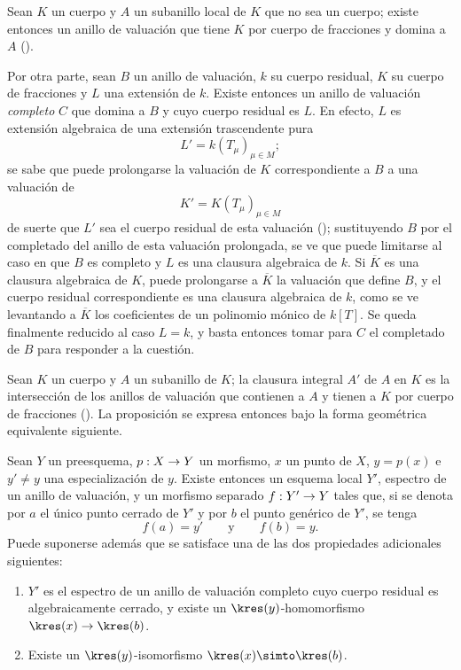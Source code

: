\documentclass[oneside,10pt]{amsart}
\makeatletter
\newcommand{\ega@arrow}[2]{\mathchoice{#1}{#2}{#2}{#2}}
\renewcommand{\to}{\ega@arrow{\longrightarrow}{\rightarrow}}
\newcommand{\oldpage}[2][]{\marginnote{\normalfont\footnotesize\textbf{#1}~|~#2}\ignorespaces}
\let\EGAOriginalLabel\label
\renewcommand{\label}[1]{\phantomsection\EGAOriginalLabel{#1}}
\makeatother
\begin{document}
\begin{env}[7.1.2]
\label{II.7.1.2}
Sean $K$ un cuerpo y $A$ un subanillo local de $K$ que no sea un cuerpo;
\oldpage[II]{139}
existe entonces un anillo de valuación que tiene $K$ por cuerpo de fracciones y domina a $A$ (\cite[p.~1-07, lema~2]{I-1}).

Por otra parte, sean $B$ un anillo de valuación, $k$ su cuerpo residual, $K$ su cuerpo de fracciones y $L$ una extensión de $k$.
Existe entonces un anillo de valuación \emph{completo} $C$ que domina a $B$ y cuyo cuerpo residual es $L$.
En efecto, $L$ es extensión algebraica de una extensión trascendente pura
\[
  L'=k(T_\mu)_{\mu\in M};
\]
se sabe que puede prolongarse la valuación de $K$ correspondiente a $B$ a una valuación de
\[
  K'=K(T_\mu)_{\mu\in M}
\]
de suerte que $L'$ sea el cuerpo residual de esta valuación (\cite[p.~98]{II-24});
sustituyendo $B$ por el completado del anillo de esta valuación prolongada, se ve que puede limitarse al caso en que $B$ es completo y $L$ es una clausura algebraica de $k$.
Si $\overline{K}$ es una clausura algebraica de $K$, puede prolongarse a $\overline{K}$ la valuación que define $B$, y el cuerpo residual correspondiente es una clausura algebraica de $k$, como se ve levantando a $\overline{K}$ los coeficientes de un polinomio mónico de $k[T]$.
Se queda finalmente reducido al caso $L=k$, y basta entonces tomar para $C$ el completado de $B$ para responder a la cuestión.
\end{env}

\begin{env}[7.1.3]
\label{II.7.1.3}
Sean $K$ un cuerpo y $A$ un subanillo de $K$;
la clausura integral $A'$ de $A$ en $K$ es la intersección de los anillos de valuación que contienen a $A$ y tienen a $K$ por cuerpo de fracciones (\cite[p.~51, th.~2]{I-11}).
La proposición  se expresa entonces bajo la forma geométrica equivalente siguiente.
\end{env}

\begin{proposition}[7.1.4]
\label{II.7.1.4}
Sean $Y$ un preesquema, $p:X\to Y$ un morfismo, $x$ un punto de $X$, $y=p(x)$ e $y'\neq y$ una especialización  de $y$.
Existe entonces un esquema local $Y'$, espectro de un anillo de valuación, y un morfismo separado $f:Y'\to Y$ tales que, si se denota por $a$ el único punto cerrado de $Y'$ y por $b$ el punto genérico de $Y'$, se tenga
\[
  f(a)=y'
  \qquad\text{y}\qquad
  f(b)=y.
\]
Puede suponerse además que se satisface una de las dos propiedades adicionales siguientes:
\begin{enumerate}
  \item[\rm{(i)}] $Y'$ es el espectro de un anillo de valuación completo cuyo cuerpo residual es algebraicamente cerrado, y existe un $\kres(y)$-homomorfismo $\kres(x)\to\kres(b)$.
  \item[\rm{(ii)}] Existe un $\kres(y)$-isomorfismo $\kres(x)\simto\kres(b)$.
\end{enumerate}
\end{proposition}
\end{document}
